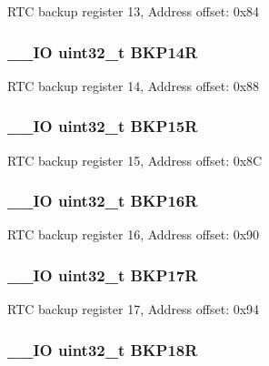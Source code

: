 R\-T\-C backup register 13, Address offset\-: 0x84 \hypertarget{struct_r_t_c___type_def_ac60f13e6619724747e61cfbff55b9fab}{
\subsubsection[{B\-K\-P14\-R}]{\setlength{\rightskip}{0pt plus 5cm}\-\_\-\-\_\-\-I\-O uint32\-\_\-t B\-K\-P14\-R}}\label{struct_r_t_c___type_def_ac60f13e6619724747e61cfbff55b9fab}
R\-T\-C backup register 14, Address offset\-: 0x88 \hypertarget{struct_r_t_c___type_def_afafaddc3a983eb71332b7526d82191ad}{
\subsubsection[{B\-K\-P15\-R}]{\setlength{\rightskip}{0pt plus 5cm}\-\_\-\-\_\-\-I\-O uint32\-\_\-t B\-K\-P15\-R}}\label{struct_r_t_c___type_def_afafaddc3a983eb71332b7526d82191ad}
R\-T\-C backup register 15, Address offset\-: 0x8\-C \hypertarget{struct_r_t_c___type_def_ad2f2eb2fb4b93e21515b10e920e719b6}{
\subsubsection[{B\-K\-P16\-R}]{\setlength{\rightskip}{0pt plus 5cm}\-\_\-\-\_\-\-I\-O uint32\-\_\-t B\-K\-P16\-R}}\label{struct_r_t_c___type_def_ad2f2eb2fb4b93e21515b10e920e719b6}
R\-T\-C backup register 16, Address offset\-: 0x90 \hypertarget{struct_r_t_c___type_def_a2842aa523df62f3508316eb3b2e08f4e}{
\subsubsection[{B\-K\-P17\-R}]{\setlength{\rightskip}{0pt plus 5cm}\-\_\-\-\_\-\-I\-O uint32\-\_\-t B\-K\-P17\-R}}\label{struct_r_t_c___type_def_a2842aa523df62f3508316eb3b2e08f4e}
R\-T\-C backup register 17, Address offset\-: 0x94 \hypertarget{struct_r_t_c___type_def_a640ccb2ccfb6316b88c070362dc29339}{
\subsubsection[{B\-K\-P18\-R}]{\setlength{\rightskip}{0pt plus 5cm}\-\_\-\-\_\-\-I\-O uint32\-\_\-t B\-K\-P18\-R}}\label{struct_r_t_c___type_def_a640ccb2ccfb6316b88c070362dc29339}

